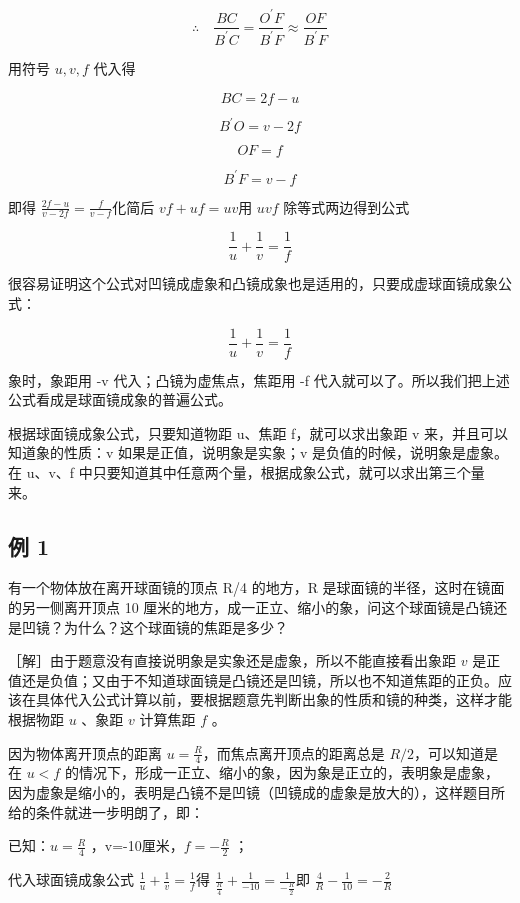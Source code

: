 \[
\therefore \quad \frac {B C}{B ^ {\prime} C} = \frac {O ^ {\prime} F}{B ^ {\prime} F} \approx \frac {O F}{B ^ {\prime} F}
\]

用符号 \(u, v, f\) 代入得

\[
B C = 2 f - u
\]

\[
B ^ {\prime} O = v - 2 f
\]

\[
O F = f
\]

\[
B ^ {\prime} F = v - f
\]

即得 \(\frac{2f - u}{v - 2f} = \frac{f}{v - f}\)化简后
\(vf + uf = uv\)用 \(uvf\) 除等式两边得到公式

\[
\frac {1}{u} + \frac {1}{v} = \frac {1}{f}
\]

很容易证明这个公式对凹镜成虚象和凸镜成象也是适用的，只要成虚球面镜成象公式：

\[
\frac {1}{u} + \frac {1}{v} = \frac {1}{f}
\]

象时，象距用 -v 代入；凸镜为虚焦点，焦距用 -f
代入就可以了。所以我们把上述公式看成是球面镜成象的普遍公式。

根据球面镜成象公式，只要知道物距 u、焦距 f，就可以求出象距 v
来，并且可以知道象的性质：v 如果是正值，说明象是实象；v
是负值的时候，说明象是虚象。在 u、v、f
中只要知道其中任意两个量，根据成象公式，就可以求出第三个量来。

\subsection{例 1}

有一个物体放在离开球面镜的顶点 R/4 的地方，R
是球面镜的半径，这时在镜面的另一侧离开顶点 10
厘米的地方，成一正立、缩小的象，问这个球面镜是凸镜还是凹镜？为什么？这个球面镜的焦距是多少？

［解］由于题意没有直接说明象是实象还是虚象，所以不能直接看出象距 \(v\)
是正值还是负值；又由于不知道球面镜是凸镜还是凹镜，所以也不知道焦距的正负。应该在具体代入公式计算以前，要根据题意先判断出象的性质和镜的种类，这样才能根据物距
\(u\) 、象距 \(v\) 计算焦距 \(f\) 。

因为物体离开顶点的距离 \(u = \frac{R}{4}\)，而焦点离开顶点的距离总是
\(R / 2\)，可以知道是在 \(u < f\)
的情况下，形成一正立、缩小的象，因为象是正立的，表明象是虚象，因为虚象是缩小的，表明是凸镜不是凹镜（凹镜成的虚象是放大的），这样题目所给的条件就进一步明朗了，即：

已知：\(u=\frac{R}{4}\) ，v=-10厘米，\(f=-\frac{R}{2}\) ；

代入球面镜成象公式 \(\frac{1}{u} +\frac{1}{v} = \frac{1}{f}\)得
\(\frac{1}{\frac{R}{4}} + \frac{1}{-10} = \frac{1}{-\frac{R}{2}}\)即
\(\frac{4}{R} -\frac{1}{10} = -\frac{2}{R}\)

